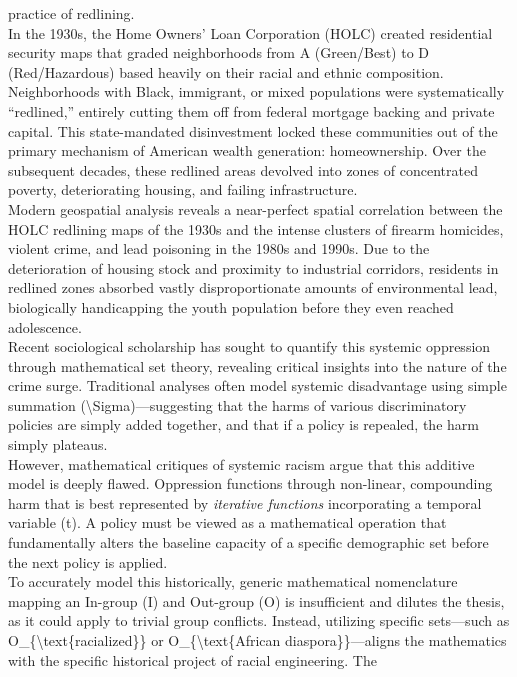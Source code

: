 \documentclass[
]{article}
\begin{document}
practice of redlining.\\
In the 1930s, the Home Owners' Loan Corporation (HOLC) created
residential security maps that graded neighborhoods from A (Green/Best)
to D (Red/Hazardous) based heavily on their racial and ethnic
composition. Neighborhoods with Black, immigrant, or mixed populations
were systematically ``redlined,'' entirely cutting them off from federal
mortgage backing and private capital. This state-mandated disinvestment
locked these communities out of the primary mechanism of American wealth
generation: homeownership. Over the subsequent decades, these redlined
areas devolved into zones of concentrated poverty, deteriorating
housing, and failing infrastructure.\\
Modern geospatial analysis reveals a near-perfect spatial correlation
between the HOLC redlining maps of the 1930s and the intense clusters of
firearm homicides, violent crime, and lead poisoning in the 1980s and
1990s. Due to the deterioration of housing stock and proximity to
industrial corridors, residents in redlined zones absorbed vastly
disproportionate amounts of environmental lead, biologically
handicapping the youth population before they even reached
adolescence.\\
Recent sociological scholarship has sought to quantify this systemic
oppression through mathematical set theory, revealing critical insights
into the nature of the crime surge. Traditional analyses often model
systemic disadvantage using simple summation
(\textbackslash Sigma)---suggesting that the harms of various
discriminatory policies are simply added together, and that if a policy
is repealed, the harm simply plateaus.\\
However, mathematical critiques of systemic racism argue that this
additive model is deeply flawed. Oppression functions through
non-linear, compounding harm that is best represented by \emph{iterative
functions} incorporating a temporal variable (t). A policy must be
viewed as a mathematical operation that fundamentally alters the
baseline capacity of a specific demographic set before the next policy
is applied.\\
To accurately model this historically, generic mathematical nomenclature
mapping an In-group (I) and Out-group (O) is insufficient and dilutes
the thesis, as it could apply to trivial group conflicts. Instead,
utilizing specific sets---such as
O\_\{\textbackslash text\{racialized\}\} or
O\_\{\textbackslash text\{African diaspora\}\}---aligns the mathematics
with the specific historical project of racial engineering. The
\end{document}
